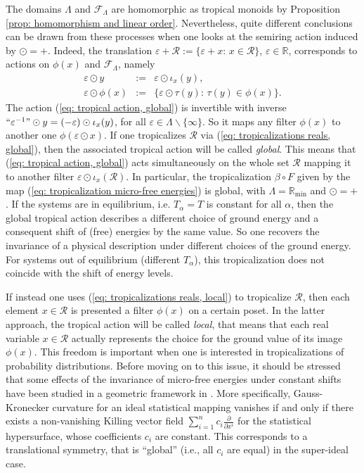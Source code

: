 \documentclass[11pt,british,reqno]{article}
\numberwithin{equation}{section}
\numberwithin{figure}{section}
\numberwithin{table}{section}
\theoremstyle{definition}
\theoremstyle{definition}
\theoremstyle{plain}
\theoremstyle{plain}
\theoremstyle{remark}
\theoremstyle{plain}
\numberwithin{equation}{section}
\numberwithin{figure}{section}
\numberwithin{table}{section}
\theoremstyle{plain}
\begin{document}
The domains $\Lambda$ and $\mathcal{F}_{\Lambda}$ are homomorphic
as tropical monoids by Proposition \ref{prop: homomorphism and linear order}.
Nevertheless, quite different conclusions can be drawn from these
processes when one looks at the semiring action induced by $\odot=+$.
Indeed, the translation $\varepsilon+\mathcal{R}:=\{\varepsilon+x:\,x\in\mathcal{R}\}$,
$\varepsilon\in\mathbb{R}$, corresponds to actions on $\phi(x)$
and $\mathcal{F}_{\Lambda}$, namely 
\begin{eqnarray} 
\varepsilon\odot y & := & \varepsilon\odot\iota_{x}(y), 
\label{eq: tropical action, global} \\  
\varepsilon\odot\phi(x) & := & \{\varepsilon\odot\tau(y):\,\tau(y)\in\phi(x)\}. 
\label{eq: tropical action, local}
\end{eqnarray}
\label{eq: tropical actions}
The action (\ref{eq: tropical action, global}) is invertible with inverse $``\varepsilon^{-1}"\odot y=(-\varepsilon)\odot\iota_{x}(y)$,
for all $\varepsilon\in\Lambda\backslash\{\infty\}$. So it maps any
filter $\phi(x)$ to another one $\phi(\varepsilon\odot x)$. If one
tropicalizes $\mathcal{R}$ via (\ref{eq: tropicalizations reals, global}),
then the associated tropical action will be called \emph{global}. This means that
(\ref{eq: tropical action, global}) acts simultaneously on the whole
set $\mathcal{R}$ mapping it to another filter $\varepsilon\odot\iota_{x}(\mathcal{R})$.
In particular, the tropicalization $\beta\circ F$ given by the map
(\ref{eq: tropicalization micro-free energies}) is global, with $\Lambda=\mathbb{R}_{\min}$
and $\odot=+$. If the systems are in equilibrium, i.e. $T_{\alpha}=T$
is constant for all $\alpha$, then the global tropical action describes
a different choice of ground energy and a consequent shift of (free)
energies by the same value. So one recovers the invariance of a physical
description under different choices of the ground energy. For systems
out of equilibrium (different $T_{\alpha}$), this tropicalization
does not coincide with the shift of energy levels. 

If instead one uses (\ref{eq: tropicalizations reals, local}) to
tropicalize $\mathcal{R}$, then each element $x\in\mathcal{R}$ is
presented a filter $\phi(x)$ on a certain poset. In the latter approach, the tropical action  will be called \emph{local}, that means that each real variable $x\in\mathcal{R}$ actually represents the choice for the ground value of its image $\phi(x)$. This freedom is important
when one is interested in tropicalizations of probability distributions.
Before moving on to this issue, it should be stressed that some effects
of the invariance of micro-free energies under constant shifts have been
studied in a geometric framework in \cite{AK2016}. More specifically,
Gauss-Kronecker curvature for an ideal statistical mapping vanishes
if and only if there exists a non-vanishing Killing vector field ${\displaystyle \sum_{i=1}^{n}c_{i}\frac{\partial}{\partial x^{i}}}$
for the statistical hypersurface, whose coefficients $c_{i}$ are
constant. This corresponds to a translational symmetry, that is ``global''
(i.e., all $c_{i}$ are equal) in the super-ideal case. 
\end{document}
